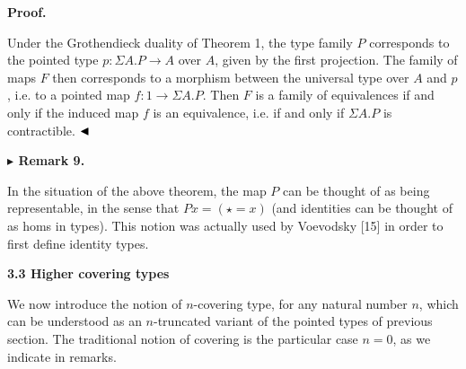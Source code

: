  
 
 
 
\par\medskip\noindent\textbf{Proof.}\par
 
 
Under the Grothendieck duality of Theorem 1, the type family $P$ corresponds to the pointed type $p:\Sigma A.P\to A$ over $A$, given by the first projection. The family of maps $F$ then corresponds to a morphism between the universal type over $A$ and $p$, i.e. to a pointed map $f:1\to\Sigma A.P$. Then $F$ is a family of equivalences if and only if the induced map $f$ is an equivalence, i.e. if and only if $\Sigma A.P$ is contractible. $\hfill\blacktriangleleft$\par
 
 
 
\par\medskip\noindent\textbf{$\blacktriangleright$ Remark 9.}\par
 
 
In the situation of the above theorem, the map $P$ can be thought of as being representable, in the sense that $Px=(\star=x)$ (and identities can be thought of as homs in types). This notion was actually used by Voevodsky [15] in order to first define identity types.\par
 
 
 
 
 
 
\par\medskip\noindent\textbf{3.3 Higher covering types}\par
 
 
We now introduce the notion of $n$-covering type, for any natural number $n$, which can be understood as an $n$-truncated variant of the pointed types of previous section. The traditional notion of covering is the particular case $n=0$, as we indicate in remarks.\par
 
